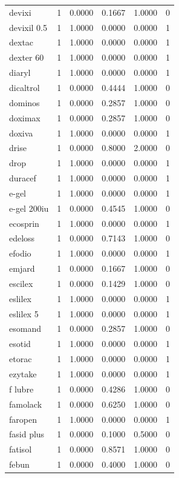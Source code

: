 \begin{longtable}{p{3.0cm}rrrrr}
devixi & 1 & 0.0000 & 0.1667 & 1.0000 & 0 \\
devixil 0.5 & 1 & 1.0000 & 0.0000 & 0.0000 & 1 \\
dextac & 1 & 1.0000 & 0.0000 & 0.0000 & 1 \\
dexter 60 & 1 & 1.0000 & 0.0000 & 0.0000 & 1 \\
diaryl & 1 & 1.0000 & 0.0000 & 0.0000 & 1 \\
dicaltrol & 1 & 0.0000 & 0.4444 & 1.0000 & 0 \\
dominos & 1 & 0.0000 & 0.2857 & 1.0000 & 0 \\
doximax & 1 & 0.0000 & 0.2857 & 1.0000 & 0 \\
doxiva & 1 & 1.0000 & 0.0000 & 0.0000 & 1 \\
drise & 1 & 0.0000 & 0.8000 & 2.0000 & 0 \\
drop & 1 & 1.0000 & 0.0000 & 0.0000 & 1 \\
duracef & 1 & 1.0000 & 0.0000 & 0.0000 & 1 \\
e-gel & 1 & 1.0000 & 0.0000 & 0.0000 & 1 \\
e-gel 200iu & 1 & 0.0000 & 0.4545 & 1.0000 & 0 \\
ecosprin & 1 & 1.0000 & 0.0000 & 0.0000 & 1 \\
edeloss & 1 & 0.0000 & 0.7143 & 1.0000 & 0 \\
efodio & 1 & 1.0000 & 0.0000 & 0.0000 & 1 \\
emjard & 1 & 0.0000 & 0.1667 & 1.0000 & 0 \\
escilex & 1 & 0.0000 & 0.1429 & 1.0000 & 0 \\
eslilex & 1 & 1.0000 & 0.0000 & 0.0000 & 1 \\
eslilex 5 & 1 & 1.0000 & 0.0000 & 0.0000 & 1 \\
esomand & 1 & 0.0000 & 0.2857 & 1.0000 & 0 \\
esotid & 1 & 1.0000 & 0.0000 & 0.0000 & 1 \\
etorac & 1 & 1.0000 & 0.0000 & 0.0000 & 1 \\
ezytake & 1 & 1.0000 & 0.0000 & 0.0000 & 1 \\
f lubre & 1 & 0.0000 & 0.4286 & 1.0000 & 0 \\
famolack & 1 & 0.0000 & 0.6250 & 1.0000 & 0 \\
faropen & 1 & 1.0000 & 0.0000 & 0.0000 & 1 \\
fasid plus & 1 & 0.0000 & 0.1000 & 0.5000 & 0 \\
fatisol & 1 & 0.0000 & 0.8571 & 1.0000 & 0 \\
febun & 1 & 0.0000 & 0.4000 & 1.0000 & 0 \\

\end{longtable}
